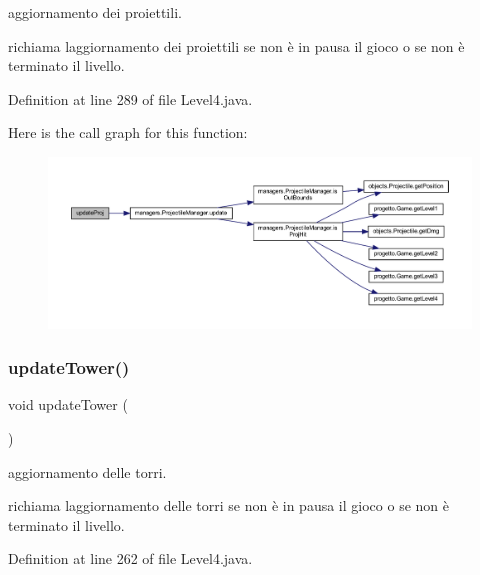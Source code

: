 aggiornamento dei proiettili. 

richiama l\textquotesingle{}aggiornamento dei proiettili se non è in pausa il gioco o se non è terminato il livello. 

Definition at line 289 of file Level4.\+java.

Here is the call graph for this function\+:
\nopagebreak
\begin{figure}[H]
\begin{center}
\leavevmode
\includegraphics[width=350pt]{classscenes_1_1_level4_ac83c203b559f6fd0bb225744d7ccf854_cgraph}
\end{center}
\end{figure}
\mbox{\label{classscenes_1_1_level4_ae4fd4a959e4d782a5e7ac0eff77ba27f}} 
\subsubsection{\texorpdfstring{update\+Tower()}{updateTower()}}
{\footnotesize\ttfamily void update\+Tower (\begin{DoxyParamCaption}{ }\end{DoxyParamCaption})}



aggiornamento delle torri. 

richiama l\textquotesingle{}aggiornamento delle torri se non è in pausa il gioco o se non è terminato il livello. 

Definition at line 262 of file Level4.\+java.

